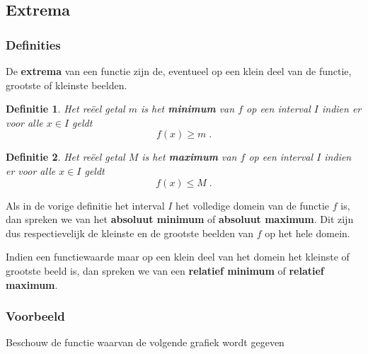 \documentclass[12pt,twoside]{article}
\newtheorem{definition}{Definitie}
\begin{document}
\newpage

\begin{theorie}

\subsection{Extrema}

\subsubsection*{Definities}

De {\bf extrema} van een functie zijn de, eventueel op een klein deel van de functie, grootste of kleinste beelden.

\begin{definition}
  Het reëel getal $m$ is het {\bf minimum} van $f$ op een interval $I$ indien er voor alle $x\in I$ geldt
  $$f(x)\geq m\;.$$
\end{definition}

\begin{definition}
  Het reëel getal $M$ is het {\bf maximum} van $f$ op een interval $I$ indien er voor alle $x\in I$ geldt
  $$f(x)\leq M\;.$$
\end{definition}

Als in de vorige definitie het interval $I$ het volledige domein van de functie $f$ is, dan spreken we van het {\bf absoluut minimum} of {\bf absoluut maximum}. Dit zijn dus respectievelijk de kleinste en de grootste beelden van $f$ op het hele domein.

Indien een functiewaarde maar op een klein deel van het domein het kleinste of grootste beeld is, dan spreken we van een {\bf relatief minimum} of {\bf relatief maximum}.

\subsubsection*{Voorbeeld}

Beschouw de functie waarvan de volgende grafiek wordt gegeven


\end{theorie}
\end{document}
